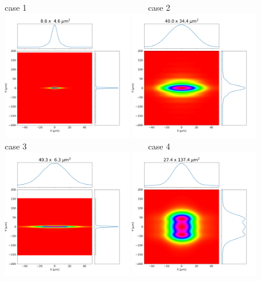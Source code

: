 \documentclass[]{article}
\begin{document}
  

\thispagestyle{empty}




\begin{figure}\label{fig:srw}
    \centering
    case 1~~~~~~~~~~~~~~~~~~~~~~~~~~~~~case 2\\
    \includegraphics[width=0.49\textwidth]{figures/case1_srw.png}
    \includegraphics[width=0.49\textwidth]{figures/case2_srw.png}\\
    case 3~~~~~~~~~~~~~~~~~~~~~~~~~~~~~case 4\\
    \includegraphics[width=0.49\textwidth]{figures/case3_srw.png}
    \includegraphics[width=0.49\textwidth]{figures/case4_srw.png}
\end{figure}

\end{document}
